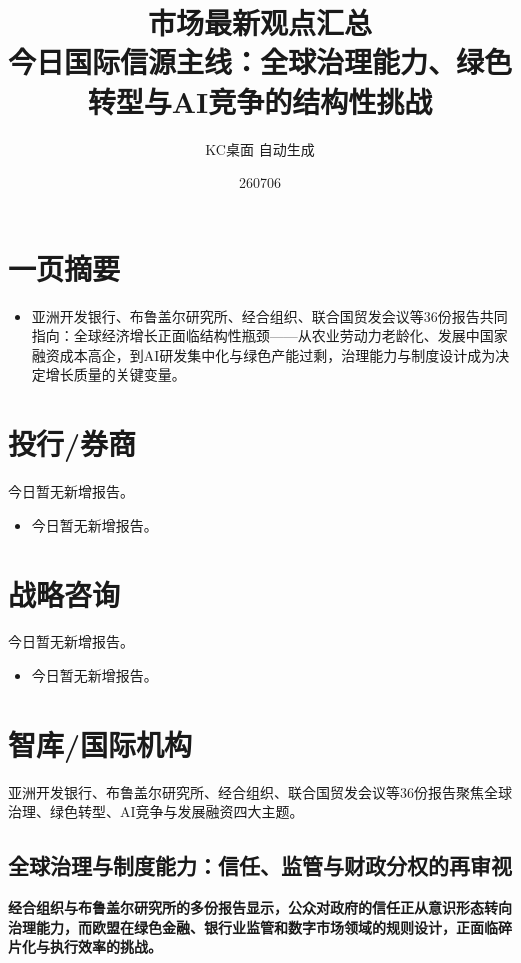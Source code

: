 \documentclass[11pt]{ctexart}
\title{\textbf{市场最新观点汇总}\\[0.4em]{\large 今日国际信源主线：全球治理能力、绿色转型与AI竞争的结构性挑战}}
\author{KC桌面 自动生成}
\date{260706}
\begin{document}
\maketitle
\tableofcontents
\newpage
\section{一页摘要}
\begin{itemize}
  \item 亚洲开发银行、布鲁盖尔研究所、经合组织、联合国贸发会议等36份报告共同指向：全球经济增长正面临结构性瓶颈——从农业劳动力老龄化、发展中国家融资成本高企，到AI研发集中化与绿色产能过剩，治理能力与制度设计成为决定增长质量的关键变量。
\end{itemize}
\section{投行/券商}
今日暂无新增报告。

\begin{itemize}
  \item 今日暂无新增报告。
\end{itemize}
\section{战略咨询}
今日暂无新增报告。

\begin{itemize}
  \item 今日暂无新增报告。
\end{itemize}
\section{智库/国际机构}
亚洲开发银行、布鲁盖尔研究所、经合组织、联合国贸发会议等36份报告聚焦全球治理、绿色转型、AI竞争与发展融资四大主题。

\subsection{全球治理与制度能力：信任、监管与财政分权的再审视}
\textbf{经合组织与布鲁盖尔研究所的多份报告显示，公众对政府的信任正从意识形态转向治理能力，而欧盟在绿色金融、银行业监管和数字市场领域的规则设计，正面临碎片化与执行效率的挑战。}
\end{document}
